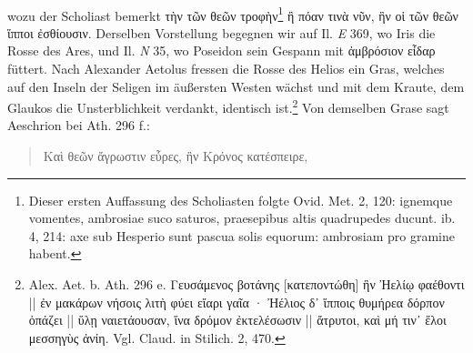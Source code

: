 \documentclass[a4paper, 11pt, oneside]{article}
\begin{document}
\paragraph{}
wozu der Scholiast bemerkt τὴν τῶν θεῶν τροφὴν\footnote{Dieser ersten Auffassung des Scholiasten folgte Ovid. Met. 2, 120: ignemque vomentes, ambrosiae suco saturos, praesepibus altis quadrupedes ducunt. ib. 4, 214: axe sub Hesperio sunt pascua solis equorum: ambrosiam pro gramine habent.} ἢ πόαν τινὰ νῦν, ἣν οἱ τῶν θεῶν ἵπποι ἐσθίουσιν. Derselben Vorstellung begegnen wir auf Il. \emph{E} 369, wo Iris die Rosse des Ares, und Il. \emph{N} 35, wo Poseidon sein Gespann mit ἀμβρόσιον εἶδαρ füttert. Nach Alexander Aetolus fressen die Rosse des Helios ein Gras, welches auf den Inseln der Seligen im äußersten Westen wächst und mit dem Kraute, dem Glaukos die Unsterblichkeit verdankt, identisch ist.\footnote{Alex. Aet. b. Ath. 296 e. Γευσάμενος βοτάνης [κατεποντώθη] ἣν Ἠελίῳ φαέθοντι || ἐν μακάρων νήσοις λιτὴ φύει εἴαρι γαῖα · Ἠέλιος δ᾽ ἵπποις θυμήρεα δόρπον ὁπάζει || ὕλῃ ναιετάουσαν, ἵνα δρόμον ἐκτελέσωσιν || ἄτρυτοι, καὶ μή τιν᾽ ἕλοι μεσσηγὺς ἀνίη. Vgl. Claud. in Stilich. 2, 470.} Von demselben Grase sagt Aeschrion bei Ath. 296 f.:
\begin{quotation}\large
Καὶ θεῶν ἄγρωστιν εὗρες, ἣν Κρόνος κατέσπειρε,
\end{quotation}
\end{document}
